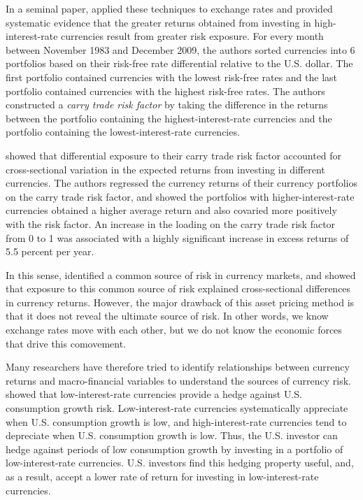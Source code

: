 \documentclass{ar-1col}
\begin{document}
In a seminal paper, \citet{LustigRoussanovVerdelhan2011} applied these techniques to exchange rates and provided systematic evidence that the greater returns obtained from investing in high-interest-rate currencies result from greater risk exposure. For every month between November 1983 and December 2009, the authors sorted currencies into 6 portfolios based on their risk-free rate differential relative to the U.S. dollar. The first portfolio contained currencies with the lowest risk-free rates and the last portfolio contained currencies with the highest risk-free rates. The authors constructed a \emph{carry trade risk factor} by taking the difference in the returns between the portfolio containing the highest-interest-rate currencies and the portfolio containing the lowest-interest-rate currencies.

\citet{LustigRoussanovVerdelhan2011} showed that differential exposure to their carry trade risk factor accounted for cross-sectional variation in the expected returns from investing in different currencies. The authors regressed the currency returns of their currency portfolios on the carry trade risk factor, and showed the portfolios with higher-interest-rate currencies obtained a higher average return and also covaried more positively with the risk factor. An increase in the loading on the carry trade risk factor from 0 to 1 was associated with a highly significant increase in excess returns of 5.5 percent per year.

In this sense, \citet{LustigRoussanovVerdelhan2011} identified a common source of risk in currency markets, and showed that exposure to this common source of risk explained cross-sectional differences in currency returns. However, the major drawback of this asset pricing method is that it does not reveal the ultimate source of risk. In other words, we know exchange rates move with each other, but we do not know the economic forces that drive this comovement.

Many researchers have therefore tried to identify relationships between currency returns and macro-financial variables to understand the sources of currency risk. \citet{LustigVerdelhan2007} showed that low-interest-rate currencies provide a hedge against U.S. consumption growth risk. Low-interest-rate currencies systematically appreciate when U.S. consumption growth is low, and high-interest-rate currencies tend to depreciate when U.S. consumption growth is low. Thus, the U.S. investor can hedge against periods of low consumption growth by investing in a portfolio of low-interest-rate currencies. U.S. investors find this hedging property useful, and, as a result, accept a lower rate of return for investing in low-interest-rate currencies.
\end{document}
